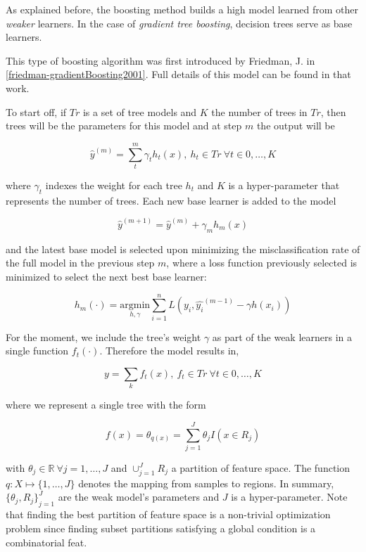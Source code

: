 As explained before, the boosting method builds a high model learned from other \textit{weaker} learners. In the case of \textit{gradient tree boosting}, decision trees serve as base learners. 

This type of boosting algorithm was first introduced by Friedman, J. in \cref{friedman-gradientBoosting2001}. Full details of this model can be found in that work.


To start off, if $Tr$ is a set of tree models and $K$ the number of trees in $Tr$, then trees will be the parameters for this model and at step $m$ the output will be

\begin{equation}
\hat{y}^{(m)}= \sum_t^m \gamma_t h_t(x) , \ h_t \in Tr \ \forall t \in {0,\ldots,K}
\end{equation}

where $\gamma_t$ indexes the weight for each tree $h_t$ and $K$ is a hyper-parameter that represents the number of trees. Each new base learner is added to the model

\begin{equation}
\hat{y}^{(m+1)} =  \hat{y}^{(m)} + \gamma_m h_m(x)
\end{equation}

and the latest base model is selected upon minimizing the misclassification rate of the full model in the previous step $m$, where a loss function previously selected is minimized to select the next best base learner:

\begin{equation}
h_m(\cdot) = \underset{h,\gamma}{\mathrm{argmin}}  \sum_{i=1}^{n} L ( y_i, \hat{y_i}^{(m-1)} - \gamma h(x_i) )
\end{equation}


For the moment, we include the tree's weight $\gamma$ as part of the weak learners in a single function $f_t(\cdot)$. Therefore the model results in,

\begin{equation}
y = \sum_k f_t(x) , \ f_t \in Tr \ \forall t \in {0,\ldots,K}
\end{equation}

where we represent a single tree with the form

\begin{equation}
f(x) = \theta_{q(x)} = \sum_{j=1}^J \theta_j I(x \in R_j)
\end{equation}

with $\theta_j \in \mathbb{R} \ \forall j = 1,\ldots,J$ and $ \cup_{j=1}^J R_j$ a partition of feature space. The function $q : X \mapsto \{1,\ldots,J\}$ denotes the mapping from samples to regions. In summary, ${\{\theta_j, R_j\}}_{j=1}^J$ are the weak model's parameters and $J$ is a hyper-parameter. Note that finding the best partition of feature space is a non-trivial optimization problem since finding subset partitions satisfying a global condition is a combinatorial feat.

